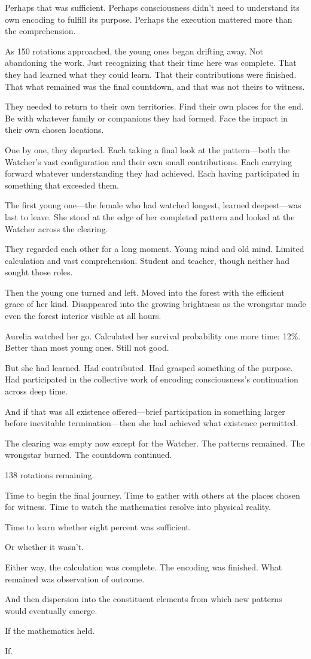 Perhaps that was sufficient. Perhaps consciousness didn't need to understand its own encoding to fulfill its purpose. Perhaps the execution mattered more than the comprehension.

\scenebreak

As 150 rotations approached, the young ones began drifting away. Not abandoning the work. Just recognizing that their time here was complete. That they had learned what they could learn. That their contributions were finished. That what remained was the final countdown, and that was not theirs to witness.

They needed to return to their own territories. Find their own places for the end. Be with whatever family or companions they had formed. Face the impact in their own chosen locations.

One by one, they departed. Each taking a final look at the pattern—both the Watcher's vast configuration and their own small contributions. Each carrying forward whatever understanding they had achieved. Each having participated in something that exceeded them.

The first young one—the female who had watched longest, learned deepest—was last to leave. She stood at the edge of her completed pattern and looked at the Watcher across the clearing.

They regarded each other for a long moment. Young mind and old mind. Limited calculation and vast comprehension. Student and teacher, though neither had sought those roles.

Then the young one turned and left. Moved into the forest with the efficient grace of her kind. Disappeared into the growing brightness as the wrongstar made even the forest interior visible at all hours.

Aurelia watched her go. Calculated her survival probability one more time: 12\%. Better than most young ones. Still not good.

But she had learned. Had contributed. Had grasped something of the purpose. Had participated in the collective work of encoding consciousness's continuation across deep time.

And if that was all existence offered—brief participation in something larger before inevitable termination—then she had achieved what existence permitted.

The clearing was empty now except for the Watcher. The patterns remained. The wrongstar burned. The countdown continued.

138 rotations remaining.

Time to begin the final journey. Time to gather with others at the places chosen for witness. Time to watch the mathematics resolve into physical reality.

Time to learn whether eight percent was sufficient.

Or whether it wasn't.

Either way, the calculation was complete. The encoding was finished. What remained was observation of outcome.

And then dispersion into the constituent elements from which new patterns would eventually emerge.

If the mathematics held.

If.

